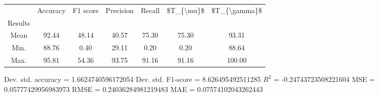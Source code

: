 \begin{tabular}{|c|c|c|c|c|c|c|}
\toprule
{} &  Accuracy &  F1 score &  Precision &  Recall &  \$T\_\{\textbackslash mu\}\$ &  \$T\_\{\textbackslash gamma\}\$ \\
Results &           &           &            &         &            &               \\
\hline
Mean    &     92.44 &     48.14 &      40.57 &   75.30 &      75.30 &         93.31 \\
Min.    &     88.76 &      0.40 &      29.11 &    0.20 &       0.20 &         88.64 \\
Max.    &     95.81 &     54.36 &      93.75 &   91.16 &      91.16 &        100.00 \\
\bottomrule
\end{tabular}

 Dev. std. accuracy = 1.6624740596172054
 Dev. std. F1-score = 8.626495492511285
 $R^2$ = -0.24743723508221604
 MSE = 0.05777429956983973
 RMSE = 0.24036284981219483
 MAE = 0.07574102043262443